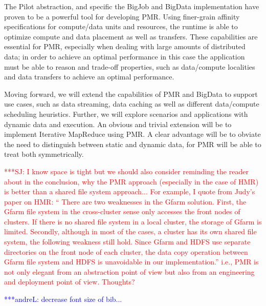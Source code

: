 \documentclass{acm_proc_article-sp}
\newcommand{\jhanote}[1]{ {\textcolor{red} { ***SJ: #1 }}}
\newcommand{\alnote}[1]{ {\textcolor{blue} { ***andreL: #1 }}}
\newcommand{\alnote}[1]{}
\newcommand{\jhanote}[1]{}
\newcommand{\upp}{\vspace*{-0.5em}}
\begin{document}

The Pilot abstraction, and specific the BigJob and BigData
implementation have proven to be a powerful tool for developing
PMR. Using finer-grain affinity specifications for compute/data units
and resources, the runtime is able to optimize compute and data
placement as well as transfers. These capabilities are essential for
PMR, especially when dealing with large amounts of distributed data;
in order to achieve an optimal performance in this case the
application must be able to reason and trade-off properties, such as
data/compute localities and data transfers to achieve an optimal
performance.

Moving forward, we will extend the capabilities of PMR and BigData to
support use cases, such as data streaming, data caching as well as
different data/compute scheduling heuristics. Further, we will explore
scenarios and applications with dynamic data and execution. An obvious
and trivial extension will be to implement Iterative MapReduce using
PMR. A clear advantage will be to obviate the need to distinguish
between static and dynamic data, for PMR will be able to treat both
symmetrically.  \upp


\jhanote{I know space is tight but we should also consider reminding
  the reader about in the conclusion, why the PMR approach (especially
  in the case of HMR) is better than a shared file system approach...
  For example, I quote from Judy's paper on HMR: `` There are two
  weaknesses in the Gfarm solution. First, the Gfarm file system in
  the cross-cluster sense only accesses the front nodes of
  clusters. If there is no shared file system in a local cluster, the
  storage of Gfarm is limited. Secondly, although in most of the
  cases, a cluster has its own shared file system, the following
  weakness still hold. Since Gfarm and HDFS use separate directories
  on the front node of each cluster, the data copy operation between
  Gfarm file system and HDFS is unavoidable in our implementation.''
  i.e., PMR is not only elegant from an abstraction point of view but
  also from an engineering and deployment point of view. Thoughts?}


\alnote{decrease font size of bib...}


%
%
%
\end{document}
